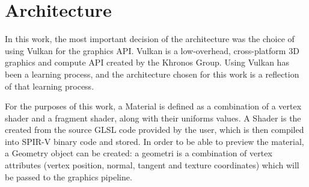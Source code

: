 \section{Architecture}
In this work, the most important decision of the architecture was the choice of
using Vulkan for the graphics API. Vulkan is a low-overhead, cross-platform 3D
graphics and compute API created by the Khronos Group. Using Vulkan has been a
learning process, and the architecture chosen for this work is a reflection of
that learning process.

For the purposes of this work, a Material is defined as a combination of a
vertex shader and a fragment shader, along with their uniforms values. A Shader
is the created from the source GLSL code provided by the user, which is then
compiled into SPIR-V binary code and stored. In order to be able to preview the
material, a Geometry object can be created: a geometri is a combination of
vertex attributes (vertex position, normal, tangent and texture coordinates)
which will be passed to the graphics pipeline.











